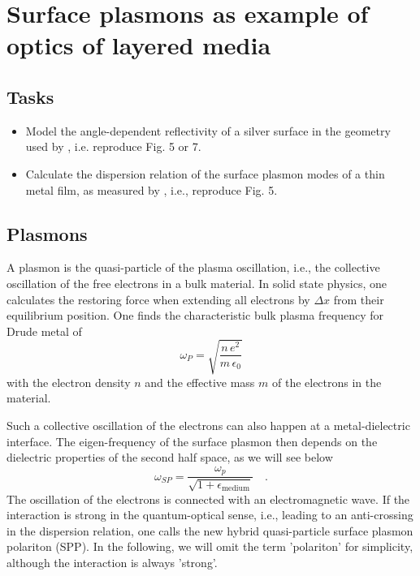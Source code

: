 \renewcommand{\lastmod}{November  11, 2021}
\renewcommand{\chapterauthors}{Markus Lippitz}


\chapter{Surface plasmons as example of optics of layered media}
\label{chap:tmatrix}


\section{Tasks}

\begin{itemize}
\item Model the angle-dependent reflectivity of a silver surface in the geometry used by \cite{Otto68}, i.e. reproduce Fig. 5 or 7.

\item Calculate the dispersion relation of the surface plasmon modes of a thin metal film, as measured by \cite{Pettit75}, i.e., reproduce Fig. 5.

\end{itemize}


\section{Plasmons}

A plasmon is the quasi-particle of the plasma oscillation, i.e., the collective oscillation of the free electrons in a bulk material. In solid state physics, one calculates the restoring force when extending all electrons by $\Delta x$ from their equilibrium position. One finds the characteristic bulk plasma frequency for  Drude metal of 
\begin{equation}
 \omega_P = \sqrt{\frac{n \, e^2}{m \, \epsilon_0}}
\end{equation}
with the electron density $n$ and the effective mass $m$ of the electrons in the material.

Such a collective oscillation of the electrons can also happen at a metal-dielectric interface. The eigen-frequency of the surface plasmon then depends on the dielectric properties of the second half space, as we will see below
\begin{equation}
\omega_{SP} = \frac{\omega_p}{\sqrt{1 + \epsilon_\text{medium}}} \quad . \label{eq:surface_omega_sp_intro}
\end{equation}
The oscillation of the electrons is connected with an electromagnetic wave.  If the interaction is strong in the quantum-optical sense, i.e., leading to an anti-crossing in the dispersion relation, one calls the new hybrid quasi-particle surface plasmon polariton (SPP). In the following, we will omit  the term 'polariton' for simplicity, although the interaction is always 'strong'.

